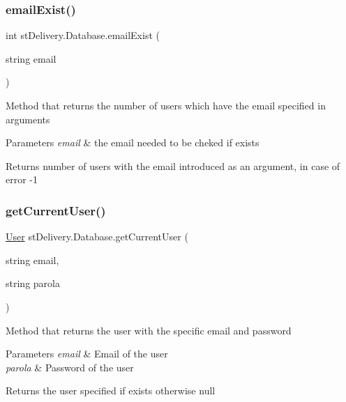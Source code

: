 \subsubsection{\texorpdfstring{email\+Exist()}{emailExist()}}
{\footnotesize\ttfamily int st\+Delivery.\+Database.\+email\+Exist (\begin{DoxyParamCaption}\item[{string}]{email }\end{DoxyParamCaption})}



Method that returns the number of users which have the email specified in arguments 


\begin{DoxyParams}{Parameters}
{\em email} & the email needed to be cheked if exists\\
\hline
\end{DoxyParams}
\begin{DoxyReturn}{Returns}
number of users with the email introduced as an argument, in case of error -\/1
\end{DoxyReturn}
\mbox{\label{classst_delivery_1_1_database_a860528216ec870d55b4b37a3400c9cf4}} 
\subsubsection{\texorpdfstring{get\+Current\+User()}{getCurrentUser()}}
{\footnotesize\ttfamily \hyperlink{classst_delivery_1_1_user}{User} st\+Delivery.\+Database.\+get\+Current\+User (\begin{DoxyParamCaption}\item[{string}]{email,  }\item[{string}]{parola }\end{DoxyParamCaption})}



Method that returns the user with the specific email and password 


\begin{DoxyParams}{Parameters}
{\em email} & Email of the user\\
\hline
{\em parola} & Password of the user\\
\hline
\end{DoxyParams}
\begin{DoxyReturn}{Returns}
the user specified if exists otherwise null
\end{DoxyReturn}
\mbox{\label{classst_delivery_1_1_database_ade64b128f02dcd31d50211940b5ba53c}} 
